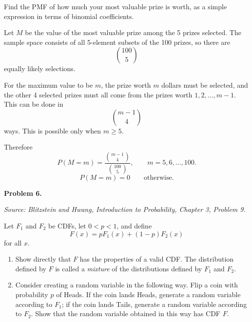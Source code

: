 \documentclass[11pt]{article}
\newcommand{\source}[1]{%
    \vspace{0.15cm}
    {\small\textit{Source: Blitzstein and Hwang, \textit{Introduction to Probability}, Chapter 3, Problem #1.}}
}
\begin{document}
Find the PMF of how much your most valuable prize is worth, as a simple expression in terms of binomial coefficients.

\begin{solutionbox}
Let $M$ be the value of the most valuable prize among the 5 prizes selected. The sample space consists of all 5-element subsets of the 100 prizes, so there are
\[
\binom{100}{5}
\]
equally likely selections.

For the maximum value to be $m$, the prize worth $m$ dollars must be selected, and the other 4 selected prizes must all come from the prizes worth $1,2,\ldots,m-1$. This can be done in
\[
\binom{m-1}{4}
\]
ways. This is possible only when $m\ge 5$.

Therefore
\[
P(M=m)=\frac{\binom{m-1}{4}}{\binom{100}{5}},
\qquad m=5,6,\ldots,100.
\]
\[
P(M=m)=0 \qquad \text{otherwise.}
\]

\end{solutionbox}
\newpage


\begin{problemheader}
\textbf{Problem 6.}
\end{problemheader}
\source{9}

Let $F_1$ and $F_2$ be CDFs, let $0<p<1$, and define
\[
F(x)=pF_1(x)+(1-p)F_2(x)
\]
for all $x$.

\begin{enumerate}[label=(\alph*), leftmargin=*]
    \item Show directly that $F$ has the properties of a valid CDF. The distribution defined by $F$ is called a \emph{mixture} of the distributions defined by $F_1$ and $F_2$.

    \item Consider creating a random variable in the following way. Flip a coin with probability $p$ of Heads. If the coin lands Heads, generate a random variable according to $F_1$; if the coin lands Tails, generate a random variable according to $F_2$. Show that the random variable obtained in this way has CDF $F$.
\end{enumerate}
\end{document}
